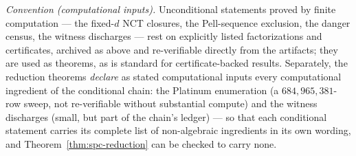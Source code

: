 \documentclass[11pt]{amsart}
\theoremstyle{plain}
\theoremstyle{definition}
\theoremstyle{remark}
\numberwithin{equation}{section}
\begin{document}
\emph{Convention (computational inputs).} Unconditional statements proved by finite computation --- the fixed-$d$ NCT closures, the Pell-sequence exclusion, the danger census, the witness discharges --- rest on explicitly listed factorizations and certificates, archived as above and re-verifiable directly from the artifacts; they are used as theorems, as is standard for certificate-backed results. Separately, the reduction theorems \emph{declare} as stated computational inputs every computational ingredient of the conditional chain: the Platinum enumeration (a $684{,}965{,}381$-row sweep, not re-verifiable without substantial compute) and the witness discharges (small, but part of the chain's ledger) --- so that each conditional statement carries its complete list of non-algebraic ingredients in its own wording, and Theorem~\ref{thm:spc-reduction} can be checked to carry none.
\end{document}

